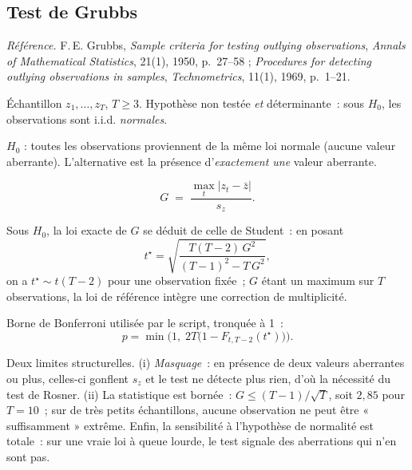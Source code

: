 \documentclass[a4paper,11pt]{article}
\newcommand{\refl}[1]{{\small\textcolor{maincolor!70!black}{\textit{Référence.} #1}}\par\smallskip}
\newcounter{ficheid}
\newenvironment{fiche}[1]{%
  \stepcounter{ficheid}%
  \phantomsection
  \subsection{#1}%
  \label{fiche:\theficheid}%
}{%
  \end{description}\vspace{0.5em}%
}
\newcommand{\Cadre}{%
  \begin{description}[leftmargin=0pt, style=unboxed, itemsep=3pt, topsep=3pt, parsep=2pt]%
  \item[\textcolor{financeblue}{\textbf{1. Cadre, notations et hypothèses de validité (non testées).}}]}
\newcommand{\Hzero}{\item[\textcolor{financeblue}{\textbf{2. Hypothèse nulle.}}]}
\newcommand{\Stat}{\item[\textcolor{financeblue}{\textbf{3. Statistique de test.}}]}
\newcommand{\Loi}{\item[\textcolor{financeblue}{\textbf{4. Loi sous $H_0$.}}]}
\newcommand{\Pval}{\item[\textcolor{financeblue}{\textbf{5. p-value.}}]}
\newcommand{\Usage}{\item[\textcolor{financeblue}{\textbf{6. Usage et limites.}}]}
\begin{document}
\begin{fiche}{Test de Grubbs}
\refl{F.\,E. Grubbs, \emph{Sample criteria for testing outlying observations}, \emph{Annals of
Mathematical Statistics}, 21(1), 1950, p.~27--58 ; \emph{Procedures for detecting outlying
observations in samples}, \emph{Technometrics}, 11(1), 1969, p.~1--21.}
\Cadre
Échantillon $z_1,\dots,z_T$, $T \ge 3$. Hypothèse non testée \emph{et} déterminante~: sous $H_0$,
les observations sont i.i.d. \emph{normales}.
\Hzero
$H_0$ : toutes les observations proviennent de la même loi normale (aucune valeur aberrante).
L'alternative est la présence d'\emph{exactement une} valeur aberrante.
\Stat
\[
  G \;=\; \frac{\max_{t}\big|z_t - \bar z\big|}{s_z}.
\]
\Loi
Sous $H_0$, la loi exacte de $G$ se déduit de celle de Student~: en posant
\[
  t^\star = \sqrt{\frac{T(T-2)\,G^2}{(T-1)^2 - T\,G^2}},
\]
on a $t^\star \sim t(T-2)$ pour une observation fixée~; $G$ étant un maximum sur $T$ observations,
la loi de référence intègre une correction de multiplicité.
\Pval
Borne de Bonferroni utilisée par le script, tronquée à 1~:
\[
  p = \min\Big(1,\; 2T\big(1 - F_{t,T-2}(t^\star)\big)\Big).
\]
\Usage
Deux limites structurelles. (i) \emph{Masquage}~: en présence de deux valeurs aberrantes ou plus,
celles-ci gonflent $s_z$ et le test ne détecte plus rien, d'où la nécessité du test de Rosner.
(ii) La statistique est bornée~: $G \le (T-1)/\sqrt{T}$, soit $2{,}85$ pour $T=10$~; sur de très
petits échantillons, aucune observation ne peut être « suffisamment » extrême. Enfin, la
sensibilité à l'hypothèse de normalité est totale~: sur une vraie loi à queue lourde, le test
signale des aberrations qui n'en sont pas.
\end{fiche}
\end{document}
